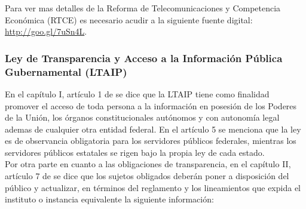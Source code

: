 \documentclass[runningheads,a4paper]{llncs}
\begin{document}
Para ver mas detalles de la Reforma de Telecomunicaciones y Competencia Económica (RTCE) es necesario acudir a la siguiente fuente digital: \url{http://goo.gl/7uSn4L}.

\subsubsection{Ley de Transparencia y Acceso a la Información Pública Gubernamental (LTAIP)}
En el capítulo I, artículo 1 de \cite{LTAIP_1} se dice que la \gls{LTAIP} tiene como finalidad promover el acceso de toda persona a la información en posesión de los Poderes de la Unión, los órganos constitucionales autónomos y con autonomía legal ademas de cualquier otra entidad federal. En el artículo 5 se menciona que la ley es de observancia obligatoria para los servidores públicos federales, mientras los servidores públicos estatales se rigen bajo la propia ley de cada estado.\\

Por otra parte en cuanto a las obligaciones de transparencia, en el capítulo II, artículo 7 de \cite{LTAIP_1} se dice que los sujetos obligados deberán poner a disposición del público y actualizar, en términos del reglamento y los lineamientos que expida el instituto o instancia equivalente la siguiente información:
\end{document}
